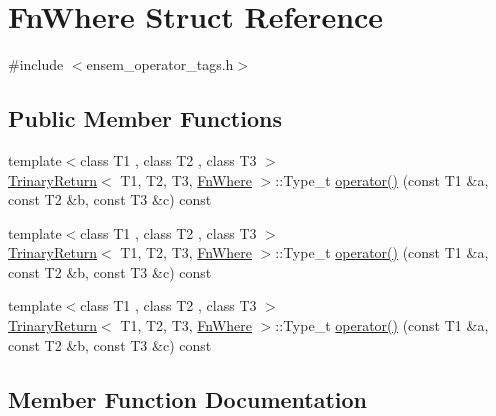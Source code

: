 \hypertarget{structFnWhere}{}\section{Fn\+Where Struct Reference}
\label{structFnWhere}


{\ttfamily \#include $<$ensem\+\_\+operator\+\_\+tags.\+h$>$}

\subsection*{Public Member Functions}
\begin{DoxyCompactItemize}
\item 
{\footnotesize template$<$class T1 , class T2 , class T3 $>$ }\\\mbox{\hyperlink{structTrinaryReturn}{Trinary\+Return}}$<$ T1, T2, T3, \mbox{\hyperlink{structFnWhere}{Fn\+Where}} $>$\+::Type\+\_\+t \mbox{\hyperlink{structFnWhere_ad37f5c32c5ad4b8288a595841b16e178}{operator()}} (const T1 \&a, const T2 \&b, const T3 \&c) const
\item 
{\footnotesize template$<$class T1 , class T2 , class T3 $>$ }\\\mbox{\hyperlink{structTrinaryReturn}{Trinary\+Return}}$<$ T1, T2, T3, \mbox{\hyperlink{structFnWhere}{Fn\+Where}} $>$\+::Type\+\_\+t \mbox{\hyperlink{structFnWhere_ad37f5c32c5ad4b8288a595841b16e178}{operator()}} (const T1 \&a, const T2 \&b, const T3 \&c) const
\item 
{\footnotesize template$<$class T1 , class T2 , class T3 $>$ }\\\mbox{\hyperlink{structTrinaryReturn}{Trinary\+Return}}$<$ T1, T2, T3, \mbox{\hyperlink{structFnWhere}{Fn\+Where}} $>$\+::Type\+\_\+t \mbox{\hyperlink{structFnWhere_ad37f5c32c5ad4b8288a595841b16e178}{operator()}} (const T1 \&a, const T2 \&b, const T3 \&c) const
\end{DoxyCompactItemize}


\subsection{Member Function Documentation}
\mbox{\label{structFnWhere_ad37f5c32c5ad4b8288a595841b16e178}} 
